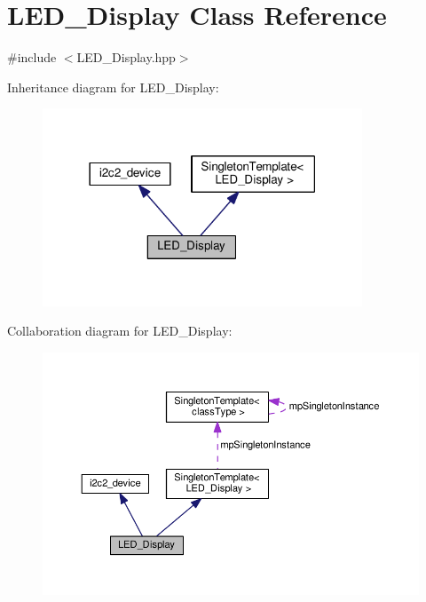 \hypertarget{classLED__Display}{}\section{L\+E\+D\+\_\+\+Display Class Reference}
\label{classLED__Display}


{\ttfamily \#include $<$L\+E\+D\+\_\+\+Display.\+hpp$>$}



Inheritance diagram for L\+E\+D\+\_\+\+Display\+:\nopagebreak
\begin{figure}[H]
\begin{center}
\leavevmode
\includegraphics[width=270pt]{df/d9b/classLED__Display__inherit__graph}
\end{center}
\end{figure}


Collaboration diagram for L\+E\+D\+\_\+\+Display\+:\nopagebreak
\begin{figure}[H]
\begin{center}
\leavevmode
\includegraphics[width=350pt]{d2/d5d/classLED__Display__coll__graph}
\end{center}
\end{figure}
